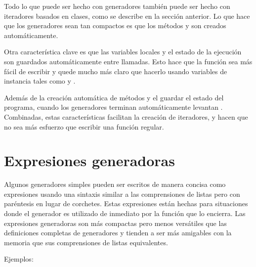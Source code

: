 \documentclass[a5paper,10pt,spanish]{sphinxmanual}
\begin{document}
\sphinxAtStartPar
Todo lo que puede ser hecho con generadores también puede ser hecho con iteradores basados en clases, como se describe en la sección anterior.  Lo que hace que los generadores sean tan compactos es que los métodos  y  son creados automáticamente.

\sphinxAtStartPar
Otra característica clave es que las variables locales y el estado de la ejecución son guardados automáticamente entre llamadas.  Esto hace que la función sea más fácil de escribir y quede mucho más claro que hacerlo usando variables de instancia tales como  y .

\sphinxAtStartPar
Además de la creación automática de métodos y el guardar el estado del programa, cuando los generadores terminan automáticamente levantan .  Combinadas, estas características facilitan la creación de iteradores, y hacen que no sea más esfuerzo que escribir una función regular.


\section{Expresiones generadoras}
\label{\detokenize{tutorial/classes:generator-expressions}}\label{\detokenize{tutorial/classes:tut-genexps}}
\sphinxAtStartPar
Algunos generadores simples pueden ser escritos de manera concisa como expresiones usando una sintaxis similar a las comprensiones de listas pero con paréntesis en lugar de corchetes. Estas expresiones están hechas para situaciones donde el generador es utilizado de inmediato por la función que lo encierra. Las expresiones generadoras son más compactas pero menos versátiles que las definiciones completas de generadores y tienden a ser más amigables con la memoria que sus comprensiones de listas equivalentes.

\sphinxAtStartPar
Ejemplos:
\end{document}
